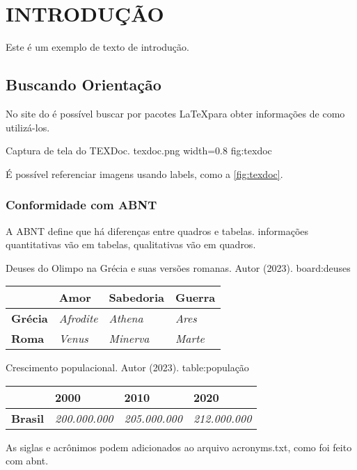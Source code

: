 \section{INTRODUÇÃO}

Este é um exemplo de texto de introdução.

\subsection{Buscando Orientação}

No site do \textcite{texdoc_2023} é possível buscar por pacotes \LaTeX para obter informações de como utilizá-los.

\ABNTfigure
{Captura de tela do TEXDoc.}
{\textcite{texdoc_2023}}
{texdoc.png}
{width=0.8\textwidth}
{fig:texdoc}

É possível referenciar imagens usando labels, como a \ref{fig:texdoc}.

\subsubsection{Conformidade com ABNT}

A ABNT define que há diferenças entre quadros e tabelas.
informações quantitativas vão em tabelas, qualitativas vão em quadros.

\ABNTboard
{Deuses do Olimpo na Grécia e suas versões romanas.}
{Autor (2023).}
{board:deuses}
{
    \begin{tabular}{|l|l|l|l|}
        \hline
                        & \textbf{Amor}     & \textbf{Sabedoria} & \textbf{Guerra} \\ \hline
        \textbf{Grécia} & \textit{Afrodite} & \textit{Athena}    & \textit{Ares}   \\ \hline
        \textbf{Roma}   & \textit{Venus}    & \textit{Minerva}   & \textit{Marte}  \\ \hline
    \end{tabular}
}


\ABNTtable
{Crescimento populacional.}
{Autor (2023).}
{table:população}
{
    \begin{tabular}{llll}
        \hline
                        & \textbf{2000}        & \textbf{2010}        & \textbf{2020}        \\ \hline
        \textbf{Brasil} & \textit{200.000.000} & \textit{205.000.000} & \textit{212.000.000} \\ \hline
    \end{tabular}
}

As siglas e acrônimos podem adicionados ao arquivo acronyms.txt, como foi feito com \ac{abnt}.
